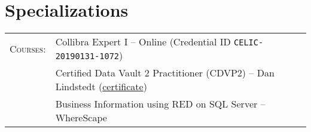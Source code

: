 \documentclass[a4paper,10pt]{article}
\begin{document}
\section{Specializations}
\begin{tabular}{rl}
  \textsc{Courses:}
  &Collibra Expert I -- Online (Credential ID \texttt{\scriptsize{CELIC-20190131-1072}})\\
  &Certified Data Vault 2 Practitioner (CDVP2) -- Dan Lindstedt (\href{https://max.pow.is/assets/5_2_12900_1435331244_CDVP2_Certificate.pdf}{certificate})\\
  &Business Information using RED on SQL Server -- WhereScape
\end{tabular}
\end{document}
